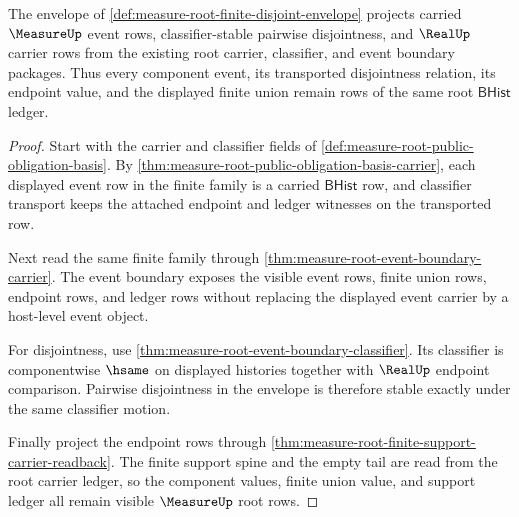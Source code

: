 \begin{theorem}
\label{thm:measure-root-finite-disjoint-carrier-classifier}
The envelope of \autoref{def:measure-root-finite-disjoint-envelope} projects
carried $\MeasureUp$ event rows, classifier-stable pairwise disjointness, and
$\RealUp$ carrier rows from the existing root carrier, classifier, and event
boundary packages. Thus every component event, its transported disjointness
relation, its endpoint value, and the displayed finite union remain rows of
the same root $\mathsf{BHist}$ ledger.
\end{theorem}
\begin{proof}
Start with the carrier and classifier fields of
\autoref{def:measure-root-public-obligation-basis}. By
\autoref{thm:measure-root-public-obligation-basis-carrier}, each displayed
event row in the finite family is a carried $\mathsf{BHist}$ row, and
classifier transport keeps the attached endpoint and ledger witnesses on the
transported row.

Next read the same finite family through
\autoref{thm:measure-root-event-boundary-carrier}. The event boundary exposes
the visible event rows, finite union rows, endpoint rows, and ledger rows
without replacing the displayed event carrier by a host-level event object.

For disjointness, use
\autoref{thm:measure-root-event-boundary-classifier}. Its classifier is
componentwise $\hsame$ on displayed histories together with $\RealUp$
endpoint comparison. Pairwise disjointness in the envelope is therefore
stable exactly under the same classifier motion.

Finally project the endpoint rows through
\autoref{thm:measure-root-finite-support-carrier-readback}. The finite
support spine and the empty tail are read from the root carrier ledger, so
the component values, finite union value, and support ledger all remain
visible $\MeasureUp$ root rows.
\end{proof}

